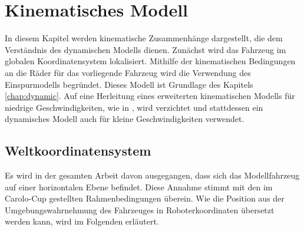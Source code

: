 \chapter{Kinematisches Modell} \label{chap:kinematik}
In diesem Kapitel werden kinematische Zusammenhänge dargestellt, die dem Verständnis des dynamischen Modells dienen. Zunächst wird das Fahrzeug im globalen Koordinatensystem lokalisiert. Mithilfe der kinematischen Bedingungen an die Räder für das vorliegende Fahrzeug wird die Verwendung des Einspurmodells begründet. Dieses Modell ist Grundlage des Kapitels \ref{chap:dynamic}. Auf eine Herleitung eines erweiterten kinematischen Modells für niedrige Geschwindigkeiten, wie in \cite{Werling2010}, wird verzichtet und stattdessen ein dynamisches Modell auch für kleine Geschwindigkeiten verwendet.

\section{Weltkoordinatensystem} \label{sec:Weltkoord}
Es wird in der gesamten Arbeit davon ausgegangen, dass sich das Modellfahrzeug auf einer horizontalen Ebene befindet.
Diese Annahme stimmt mit den im Carolo-Cup gestellten Rahmenbedingungen überein. 
Wie die Position aus der Umgebungswahrnehmung des Fahrzeuges in Roboterkoordinaten übersetzt werden kann, wird im Folgenden erläutert.